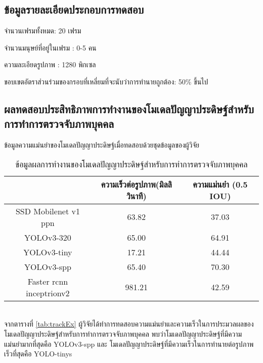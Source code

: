 \subsection{ข้อมูลรายละเอียดประกอบการทดสอบ}
จำนวนเฟรมทั้งหมด: 20 เฟรม

จำนวนมนุษย์ที่อยู่ในเฟรม : 0-5 คน

ความละเอียดรูปภาพ : 1280   พิกเซล

ขอบเขตอัตราส่วนร่วมของกรอบที่เหลี่ยมที่จะนับว่าการทำนายถูกต้อง: 50\% ขึ้นไป


\subsection{ผลทดสอบประสิทธิภาพการทำงานของโมเดลปัญญาประดิษฐ์สำหรับการทำการตรวจจับภาพบุคคล}

ข้อมูลความแม่นยำของโมเดลปัญญาประดิษฐ์เมื่อทดสอบด้วยชุดข้อมูลของผู้วิจัย
\begin{table}[!ht]
	\centering
	\begin{tabular}{|c|c|c|}
			\hline 
			{}&{ความเร็วต่อรูปภาพ(มิลลิวินาที)}&{ความแม่นยำ (0.5 IOU)}			\\
			\hline
			SSD Mobilenet v1 ppn	 					& 63.82 		& 37.03			\\
			YOLOv3-320							& 65.00		& 64.91		\\
			YOLOv3-tiny							& 17.21		& 44.44			\\
			YOLOv3-spp							& 65.40		& 70.30			\\	
			Faster rcnn inceptrionv2					& 981.21		& 42.59		\\
		\hline
	\end{tabular}
	\caption{ข้อมูลผลการทำงานของโมเดลปัญญาประดิษฐ์สำหรับการทำการตรวจจับภาพบุคคล}
    \label{tab:origina_detectEx}
\end{table}
\\
จากตารางที่ \ref{tab:trackEx} ผู้วิจัยได้ทำการทดสอบความแม่นยำและความเร็วในการประมวลผลของโมเดลปัญญาประดิษฐ์สำหรับการทำการตรวจจับภาพบุคคล พบว่าโมเดลปัญญาประดิษฐ์ที่มีความแม่นยำมากที่สุดคือ YOLOv3-spp และ โมเดลปัญญาประดิษฐ์ที่มีความเร็วในการทำนายต่อรูปภาพเร็วที่สุดคือ YOLO-tinys